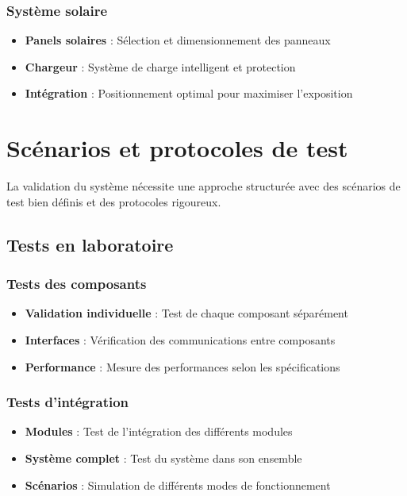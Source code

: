 {\subsubsection{Système solaire}
\begin{itemize}
    \item \textbf{Panels solaires} : Sélection et dimensionnement des panneaux
    \item \textbf{Chargeur} : Système de charge intelligent et protection
    \item \textbf{Intégration} : Positionnement optimal pour maximiser l'exposition
\end{itemize}

\section{Scénarios et protocoles de test}
La validation du système nécessite une approche structurée avec des scénarios de test bien définis et des protocoles rigoureux.

\subsection{Tests en laboratoire}
\subsubsection{Tests des composants}
\begin{itemize}
    \item \textbf{Validation individuelle} : Test de chaque composant séparément
    \item \textbf{Interfaces} : Vérification des communications entre composants
    \item \textbf{Performance} : Mesure des performances selon les spécifications
\end{itemize}

\subsubsection{Tests d'intégration}
\begin{itemize}
    \item \textbf{Modules} : Test de l'intégration des différents modules
    \item \textbf{Système complet} : Test du système dans son ensemble
    \item \textbf{Scénarios} : Simulation de différents modes de fonctionnement
\end{itemize}

}

